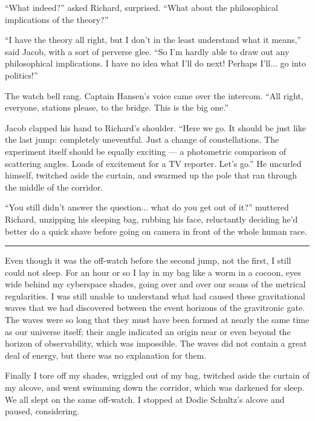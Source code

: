 \documentclass[english,11pt,letterpaper,onecolumn]{scrbook}
\begin{document}
	``What indeed?'' asked Richard, surprised.  ``What about the philosophical implications of the theory?''

	``I have the theory all right, but I don't in the least understand what it means,'' said Jacob, with a sort of perverse glee.  ``So I'm hardly able to draw out any philosophical implications.  I have no idea what I'll do next!  Perhaps I'll... go into politics!''

	The watch bell rang.  Captain Hansen's voice came over the intercom.  ``All right, everyone, stations please, to the bridge.  This is the big one.''

	Jacob clapped his hand to Richard's shoulder.  ``Here we go.  It should be just like the last jump:  completely uneventful.  Just a change of constellations.  The experiment itself should be equally exciting --- a photometric comparison of scattering angles.  Loads of excitement for a TV reporter.  Let's go.''  He uncurled himself, twitched aside the curtain, and swarmed up the pole that ran through the middle of the corridor.

	``You still didn't answer the question... what do you get out of it?'' muttered Richard, unzipping his sleeping bag, rubbing his face, reluctantly deciding he'd better do a quick shave before going on camera in front of the whole human race.
		
\begin{center}\rule[3pt]{2in}{0.5pt}\end{center}

	Even though it was the off-watch before the second jump, not the first, I still could not sleep.  For an hour or so I lay in my bag like a worm in a cocoon, eyes wide behind my cyberspace shades, going over and over our scans of the metrical regularities.  I was still unable to understand what had caused these gravitational waves that we had discovered between the event horizons of the gravitronic gate. The waves were so long that they must have been formed at nearly the same time as our universe itself; their angle indicated an origin near or even beyond the horizon of observability, which was impossible.  The waves did not contain a great deal of energy, but there was no explanation for them.

	Finally I tore off my shades, wriggled out of my bag, twitched aside the curtain of my alcove, and went swimming down the corridor, which was darkened for sleep.  We all slept on the same off-watch.  I stopped at Dodie Schultz's alcove and paused, considering.
\end{document}

